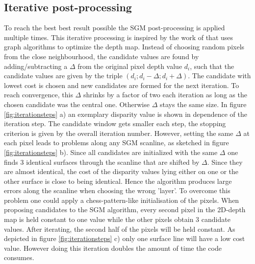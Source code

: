 \documentclass  [
  paper    = a4,
  BCOR     = 10mm,
  twoside,
  fontsize = 12pt,
  fleqn,
  toc      = bibnumbered,
  toc      = listofnumbered,
  numbers  = noendperiod,
  headings = normal,
  listof   = leveldown,
  version  = 3.03
]                                       {scrreprt}
\begin{document}
\subsection{Iterative post-processing}
\label{sec:iterative}
To reach the best best result possible the SGM post-processing is applied multiple times. This iterative processing is inspired by the work of \cite{Benjaminsarbeit} that uses graph algorithms to optimize the depth map. Instead of choosing random pixels from the close neighbourhood, the candidate values are found by adding/subtracting a $\Delta$ from the original pixel depth value $d_{i}$, such that the candidate values are given by the triple $(d_{i};d_{i}-\Delta;d_{i}+\Delta)$. The candidate with lowest cost is chosen and new candidates are formed for the next iteration. To reach convergence, this $\Delta$ shrinks by a factor of two each iteration as long as the chosen candidate was the central one. Otherwise $\Delta$ stays the same size. In figure \ref{fig:iterationsteps} a) an exemplary disparity value is shown in dependence of the iteration step. The candidate window gets smaller each step, the stopping criterion is given by the overall iteration number. 
However, setting the same $\Delta$ at each pixel leads to problems along any SGM scanline, as sketched in figure \ref{fig:iterationsteps} b). Since all candidates are initialized with the same $\Delta$ one finds 3 identical surfaces through the scanline that are shifted by $\Delta$. Since they are almost identical, the cost of the disparity values lying either on one or the other surface is close to being identical. Hence the algorithm produces large errors along the scanline when choosing the wrong 'layer'. To overcome this problem one could apply a chess-pattern-like initialisation of the pixels. When proposing candidates to the SGM algorithm, every second pixel in the 2D-depth map is held constant to one value while the other pixels obtain 3 candidate values. After iterating, the second half of the pixels will be held constant. As depicted in figure \ref{fig:iterationsteps} c) only one surface line will have a low cost value. However doing this iteration doubles the amount of time the code consumes. 
\end{document}
